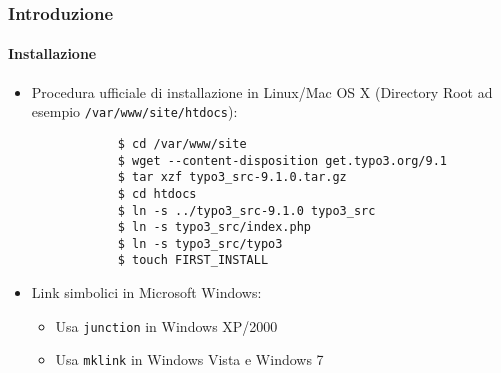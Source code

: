 \begin{frame}[fragile]
	\frametitle{Introduzione}
	\framesubtitle{Installazione}

	\begin{itemize}
		\item Procedura ufficiale di installazione in Linux/Mac OS X\newline
			(Directory Root ad esempio \texttt{/var/www/site/htdocs}):
		\begin{lstlisting}
			$ cd /var/www/site
			$ wget --content-disposition get.typo3.org/9.1
			$ tar xzf typo3_src-9.1.0.tar.gz
			$ cd htdocs
			$ ln -s ../typo3_src-9.1.0 typo3_src
			$ ln -s typo3_src/index.php
			$ ln -s typo3_src/typo3
			$ touch FIRST_INSTALL
		\end{lstlisting}

		\item Link simbolici in Microsoft Windows:

			\begin{itemize}
				\item Usa \texttt{junction} in Windows XP/2000
				\item Usa \texttt{mklink} in Windows Vista e Windows 7
			\end{itemize}

	\end{itemize}
\end{frame}


